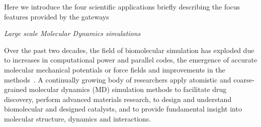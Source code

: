 \documentclass{sig-alternate}
\begin{document}
%
%
%
%
%
%
%


Here we introduce the four scientific applications briefly describing the focus features provided by the gateways

\textit{Large scale Molecular Dynamics simulations}

Over the past two decades, the field of biomolecular simulation has
exploded due to increases in computational power and parallel codes,
the emergence of accurate molecular mechanical potentials or force
fields and improvements in the methods~\cite{cheatham-1,
  cheatham-2}. A continually growing body of researchers apply
atomistic and coarse-grained molecular dynamics (MD) simulation
methods to facilitate drug discovery, perform advanced materials
research, to design and understand biomolecular and designed
catalysts, and to provide fundamental insight into molecular
structure, dynamics and interactions. 
\end{document}

